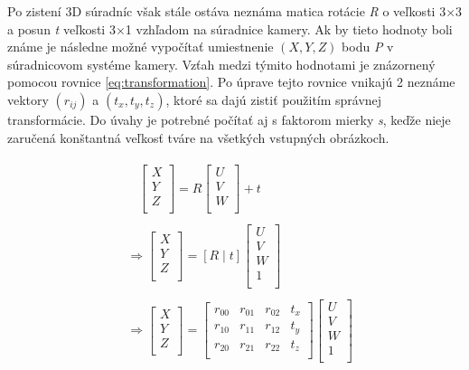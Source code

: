 \documentclass[slovak,master,dept460,male,cpp,cpdeclaration]{diploma}
\begin{document}
Po zistení 3D súradníc však stále ostáva neznáma matica rotácie \textit{R} o veľkosti 3$\times$3 a posun  \textit{t} veľkosti 3$\times$1 vzhľadom na súradnice kamery. Ak by tieto hodnoty boli známe je následne možné vypočítať umiestnenie $(X, Y, Z)$ bodu \textit{P} v súradnicovom systéme kamery. Vzťah medzi týmito hodnotami je znázornený pomocou rovnice \ref{eq:transformation}. Po úprave tejto rovnice vnikajú 2 neznáme vektory $(r_{ij})$ a $(t_{x},t_{y},t_{z})$, ktoré sa dajú zistiť použitím správnej transformácie. Do úvahy je potrebné počítať aj s faktorom mierky \textit{s}, keďže nieje zaručená konštantná veľkosť tváre na všetkých vstupných obrázkoch.


\begin{eqnarray}
\begin{split}
&\ \ \ \ \begin{bmatrix}
X\\ 
Y\\ 
Z\\
\end{bmatrix}
= R
\begin{bmatrix}
U\\ 
V\\ 
W\\ 
\end{bmatrix}
+ t
\\
\\
&\Rightarrow
\begin{bmatrix}
X\\ 
Y\\ 
Z\\
\end{bmatrix}
= \left[R \mid t\right]
\begin{bmatrix}
U\\ 
V\\ 
W\\
1\\
\end{bmatrix}
\\
\\
&\Rightarrow
\begin{bmatrix}
X\\ 
Y\\ 
Z\\
\end{bmatrix}
=
\begin{bmatrix}
r_{00} & r_{01} & r_{02} & t_{x}\\ 
r_{10} & r_{11} & r_{12} & t_{y}\\ 
r_{20} & r_{21} & r_{22} & t_{z}\\
\end{bmatrix}
\begin{bmatrix}
U\\ 
V\\ 
W\\
1\\
\end{bmatrix}
\label{eq:transformation}
\end{split}
\end{eqnarray}
\end{document}
